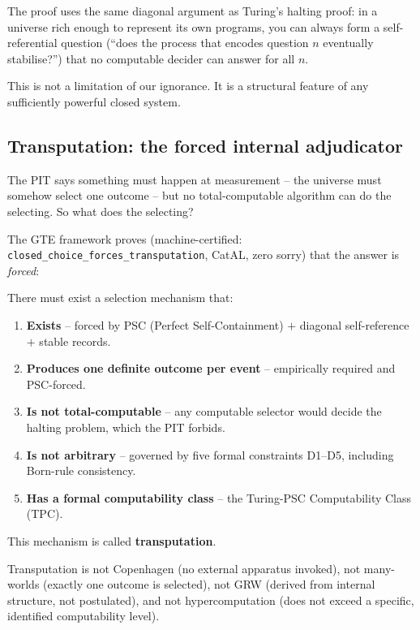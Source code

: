 \documentclass[11pt,a4paper]{article}
\newcommand{\term}[1]{\textbf{#1}}
\newcommand{\lean}[1]{\texttt{#1}}
\begin{document}
The proof uses the same diagonal argument as Turing's halting proof: in a
universe rich enough to represent its own programs, you can always form
a self-referential question (``does the process that encodes question $n$
eventually stabilise?'') that no computable decider can answer for all $n$.

This is not a limitation of our ignorance.  It is a structural feature of
any sufficiently powerful closed system.

\subsection{Transputation: the forced internal adjudicator}

The PIT says something must happen at measurement -- the universe must
somehow select one outcome -- but no total-computable algorithm can do the
selecting. So what does the selecting?

The GTE framework proves (machine-certified: \lean{closed\_choice\_forces\_transputation},
CatAL, zero sorry) that the answer is \emph{forced}:

\begin{tcolorbox}[colback=boxorange,colframe=orange!60!black,
  title={Transputation: The Formally Forced Fourth Option (CatAL)}]
There must exist a selection mechanism that:
\begin{enumerate}
  \item \textbf{Exists} -- forced by PSC (Perfect Self-Containment) $+$
    diagonal self-reference $+$ stable records.
  \item \textbf{Produces one definite outcome per event} -- empirically
    required and PSC-forced.
  \item \textbf{Is not total-computable} -- any computable selector would
    decide the halting problem, which the PIT forbids.
  \item \textbf{Is not arbitrary} -- governed by five formal constraints
    D1--D5, including Born-rule consistency.
  \item \textbf{Has a formal computability class} -- the Turing-PSC
    Computability Class (TPC).
\end{enumerate}
This mechanism is called \term{transputation}.
\end{tcolorbox}

\noindent
Transputation is not Copenhagen (no external apparatus invoked), not
many-worlds (exactly one outcome is selected), not GRW (derived from
internal structure, not postulated), and not hypercomputation (does not
exceed a specific, identified computability level).
\end{document}
